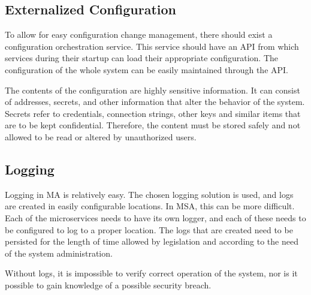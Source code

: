 \subsection{Externalized Configuration}
\begin{sloppypar}
    To allow for easy configuration change management, there should exist a
    configuration orchestration service. This service should have an API from
    which services during their startup can load their appropriate configuration.
    The configuration of the whole system can be easily maintained through the
    API.
\end{sloppypar}
\begin{sloppypar}
    The contents of the configuration are highly sensitive information. It can
    consist of addresses, secrets, and other information that alter the behavior
    of the system. Secrets refer to credentials, connection strings, other keys
    and similar items that are to be kept confidential. Therefore, the content
    must be stored safely and not allowed to be read or altered by unauthorized
    users.
\end{sloppypar}

\subsection{Logging}
\begin{sloppypar}
    Logging in MA is relatively easy. The chosen logging solution is used, and
    logs are created in easily configurable locations. In MSA, this can be more
    difficult. Each of the microservices needs to have its own logger, and each
    of these needs to be configured to log to a proper location. The logs that
    are created need to be persisted for the length of time allowed by
    legislation and according to the need of the system administration.
\end{sloppypar}
\begin{sloppypar}
    Without logs, it is impossible to verify correct operation of the system, nor
    is it possible to gain knowledge of a possible security breach. 
\end{sloppypar}

